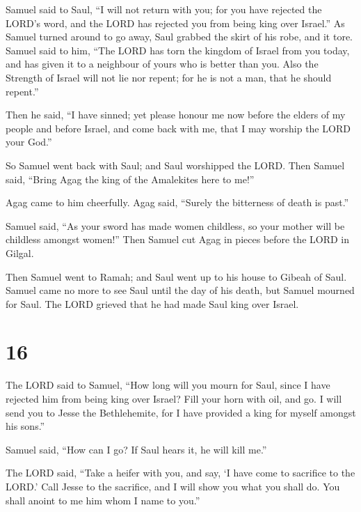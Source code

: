  Samuel said to Saul, ``I will not return with you; for
you have rejected the LORD's word, and the LORD has rejected you from
being king over Israel.''  As Samuel turned around to go
away, Saul grabbed the skirt of his robe, and it tore. 
Samuel said to him, ``The LORD has torn the kingdom of Israel from you
today, and has given it to a neighbour of yours who is better than you.
 Also the Strength of Israel will not lie nor repent; for
he is not a man, that he should repent.''

 Then he said, ``I have sinned; yet please honour me now
before the elders of my people and before Israel, and come back with me,
that I may worship the LORD your God.''

 So Samuel went back with Saul; and Saul worshipped the
LORD.  Then Samuel said, ``Bring Agag the king of the
Amalekites here to me!''

Agag came to him cheerfully. Agag said, ``Surely the bitterness of death
is past.''

 Samuel said, ``As your sword has made women childless,
so your mother will be childless amongst women!'' Then Samuel cut Agag
in pieces before the LORD in Gilgal.

 Then Samuel went to Ramah; and Saul went up to his house
to Gibeah of Saul.  Samuel came no more to see Saul until
the day of his death, but Samuel mourned for Saul. The LORD grieved that
he had made Saul king over Israel.

\hypertarget{section-15}{%
\section{16}\label{section-15}}

 The LORD said to Samuel, ``How long will you mourn for
Saul, since I have rejected him from being king over Israel? Fill your
horn with oil, and go. I will send you to Jesse the Bethlehemite, for I
have provided a king for myself amongst his sons.''

 Samuel said, ``How can I go? If Saul hears it, he will
kill me.''

The LORD said, ``Take a heifer with you, and say, `I have come to
sacrifice to the LORD.'  Call Jesse to the sacrifice, and
I will show you what you shall do. You shall anoint to me him whom I
name to you.''

